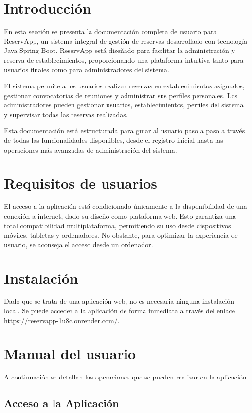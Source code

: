
\section{Introducción}
En esta sección se presenta la documentación completa de usuario para ReservApp, un sistema integral de gestión de reservas desarrollado con tecnología Java Spring Boot. ReservApp está diseñado para facilitar la administración y reserva de establecimientos, proporcionando una plataforma intuitiva tanto para usuarios finales como para administradores del sistema.

El sistema permite a los usuarios realizar reservas en establecimientos asignados, gestionar convocatorias de reuniones y administrar sus perfiles personales. Los administradores pueden gestionar usuarios, establecimientos, perfiles del sistema y supervisar todas las reservas realizadas.

Esta documentación está estructurada para guiar al usuario paso a paso a través de todas las funcionalidades disponibles, desde el registro inicial hasta las operaciones más avanzadas de administración del sistema.

\section{Requisitos de usuarios}
El acceso a la aplicación está condicionado únicamente a la disponibilidad de una conexión a internet, dado su diseño como plataforma web. Esto garantiza una total compatibilidad multiplataforma, permitiendo su uso desde dispositivos móviles, tabletas y ordenadores. No obstante, para optimizar la experiencia de usuario, se aconseja el acceso desde un ordenador.

\section{Instalación}
Dado que se trata de una aplicación web, no es necesaria ninguna instalación local. Se puede acceder a la aplicación de forma inmediata a través del enlace \url{https://reservapp-1u8c.onrender.com/}.

\section{Manual del usuario}
A continuación se detallan las operaciones que se pueden realizar en la aplicación.

\subsection{Acceso a la Aplicación}

